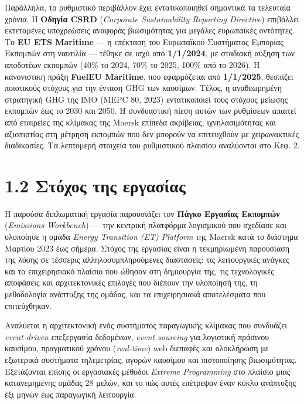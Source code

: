 Παράλληλα, το ρυθμιστικό περιβάλλον έχει εντατικοποιηθεί σημαντικά τα
τελευταία χρόνια. Η \textbf{Οδηγία CSRD} (\emph{Corporate Sustainability
Reporting Directive}) επιβάλλει εκτεταμένες υποχρεώσεις αναφοράς
βιωσιμότητας για μεγάλες ευρωπαϊκές οντότητες. Το \textbf{EU ETS
Maritime} --- η επέκταση του Ευρωπαϊκού Συστήματος Εμπορίας Εκπομπών στη
ναυτιλία --- τέθηκε σε ισχύ από \textbf{1/1/2024}, με σταδιακή αύξηση
των αποδοτέων εκπομπών (40\% το 2024, 70\% το 2025, 100\% από το 2026).
Η κανονιστική πράξη \textbf{FuelEU Maritime}, που εφαρμόζεται από
\textbf{1/1/2025}, θεσπίζει ποιοτικούς στόχους για την ένταση GHG των
καυσίμων. Τέλος, η αναθεωρημένη στρατηγική GHG της IMO (MEPC 80, 2023)
εντατικοποιεί τους στόχους μείωσης εκπομπών έως το 2030 και 2050. Η
συνδυαστική πίεση αυτών των ρυθμίσεων απαιτεί από εταιρείες της κλίμακας
της Maersk επίπεδα ακρίβειας, ιχνηλασιμότητας και αξιοπιστίας στη
μέτρηση εκπομπών που δεν μπορούν να επιτευχθούν με χειρωνακτικές
διαδικασίες. Τα λεπτομερή στοιχεία του ρυθμιστικού πλαισίου αναλύονται
στο Κεφ. 2.

\section{1.2 Στόχος της
εργασίας}\label{ux3c3ux3c4ux3ccux3c7ux3bfux3c2-ux3c4ux3b7ux3c2-ux3b5ux3c1ux3b3ux3b1ux3c3ux3afux3b1ux3c2}

Η παρούσα διπλωματική εργασία παρουσιάζει τον \textbf{Πάγκο Εργασίας
Εκπομπών} (\emph{Emissions Workbench}) --- την κεντρική πλατφόρμα
λογισμικού που σχεδίασε και υλοποίησε η ομάδα \emph{Energy Transition
(ET) Platform} της Maersk κατά το διάστημα Μαρτίου 2023 έως σήμερα.
Στόχος της εργασίας είναι η τεκμηριωμένη παρουσίαση της λύσης σε
τέσσερις αλληλοσυμπληρούμενες διαστάσεις: τις λειτουργικές ανάγκες και
το επιχειρησιακό πλαίσιο που ώθησαν στη δημιουργία της, τις τεχνολογικές
αποφάσεις και αρχιτεκτονικές επιλογές που διέπουν την υλοποίησή της, τη
μεθοδολογία ανάπτυξης της ομάδας, και τα επιχειρησιακά αποτελέσματα που
επιτεύχθηκαν.

Αναλύεται η αρχιτεκτονική ενός συστήματος παραγωγικής κλίμακας που
συνδυάζει \emph{event-driven} επεξεργασία δεδομένων, \emph{event
sourcing} για λογιστική πράσινου καυσίμου, πραγματικού χρόνου
(\emph{real-time}) web διεπαφές και ολοκλήρωση με εξωτερικά συστήματα
τηλεμετρίας, αγορών καυσίμου και πιστοποίησης βιωσιμότητας. Εξετάζονται
επίσης οι εργασιακές μέθοδοι \emph{Extreme Programming} στο πλαίσιο μιας
κατανεμημένης ομάδας 28 μελών, και το πώς αυτές επέτρεψαν έναν κύκλο
ανάπτυξης έξι μηνών έως παραγωγική λειτουργία.

